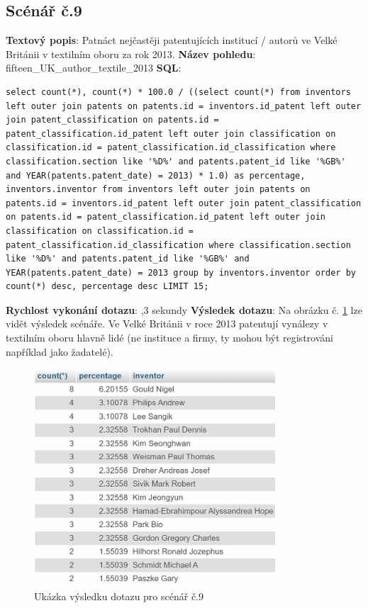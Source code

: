 \newpage
\subsection{Scénář č.9}
\textbf{Textový popis}: Patnáct nejčastěji patentujících institucí / autorů ve Velké Británii v textilním oboru za rok 2013.
\newline
\textbf{Název pohledu}: fifteen\_UK\_author\_textile\_2013
\newline
\textbf{SQL}: 
\begin{lstlisting}[label = {lst:elements_a}]
select count(*), count(*) * 100.0 / ((select count(*) from inventors left outer join patents on patents.id = inventors.id_patent left outer join patent_classification on patents.id = patent_classification.id_patent left outer join classification on classification.id = patent_classification.id_classification where classification.section like '%D%' and patents.patent_id like '%GB%' and YEAR(patents.patent_date) = 2013) * 1.0) as percentage, inventors.inventor from inventors left outer join patents on patents.id = inventors.id_patent left outer join patent_classification on patents.id = patent_classification.id_patent left outer join classification on classification.id = patent_classification.id_classification where classification.section like '%D%' and patents.patent_id like '%GB%' and YEAR(patents.patent_date) = 2013 group by inventors.inventor order by count(*) desc, percentage desc LIMIT 15;
\end{lstlisting}
\textbf{Rychlost vykonání dotazu}: ,3 sekundy
\newline
\textbf{Výsledek dotazu}: Na obrázku č. \ref{fig:scenar9} lze vidět výsledek scénáře. Ve Velké Británii v roce 2013 patentují vynálezy v textilním oboru hlavně lidé (ne instituce a firmy, ty mohou být registrováni například jako žadatelé). 
\begin{figure}[H]
\centering
\includegraphics[width=9cm]{img/scenare/scenar_9}
\caption{Ukázka výsledku dotazu pro scénář č.9}
\label{fig:scenar9}
\end{figure}